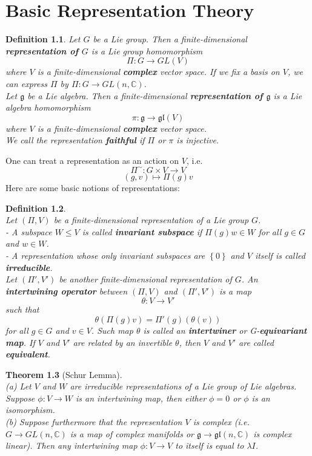 \documentclass[11pt]{book}
\newtheorem{theorem}{Theorem}[section]
\newtheorem{definition}[theorem]{Definition}
\newcommand{\bb}[1]{\mathbb{#1}}
\newcommand{\mf}[1]{\mathfrak{#1}}
\begin{document}
\newpage

\chapter{Basic Representation Theory}
\begin{definition}
Let $G$ be a Lie group. Then a finite-dimensional \textbf{representation of $G$} is a Lie group homomorphism
$$\Pi: G \to GL(V)$$
where $V$ is a finite-dimensional \textbf{complex} vector space. If we fix a basis on $V$, we can express $\Pi$ by $\Pi: G \to GL(n,\bb{C})$.\\
Let $\mf{g}$ be a Lie algebra. Then a finite-dimensional \textbf{representation of $\mf{g}$} is a Lie algebra homomorphism
$$\pi: \mf{g} \to \mf{gl}(V)$$
where $V$ is a finite-dimensional \textbf{complex} vector space.\\
We call the representation \textbf{faithful} if $\Pi$ or $\pi$ is injective.
\end{definition}
One can treat a representation as an action on $V$, i.e.
$$\Pi^{\sim}: G \times V \to V$$
$$(g,v) \mapsto \Pi(g)v$$
Here are some basic notions of representations:
\begin{definition} \mbox{}\\
Let $(\Pi,V)$ be a finite-dimensional representation of a Lie group $G$.\\
- A subspace $W \leq V$ is called \textbf{invariant subspace} if $\Pi(g)w \in W$ for all $g \in G$ and $w \in W$.\\
- A representation whose only invariant subspaces are $\left\{0\right\}$ and $V$ itself is called \textbf{irreducible}.\\
Let $(\Pi', V')$ be another finite-dimensional representation of $G$. An \textbf{intertwining operator} between $(\Pi,V)$ and $(\Pi',V')$ is a map
$$\theta: V \to V'$$
such that
$$\theta(\Pi(g)v) = \Pi'(g)(\theta(v))$$
for all $g \in G$ and $v \in V$. Such map $\theta$ is called an \textbf{intertwiner} or G-\textbf{equivariant map}.
If $V$ and $V'$ are related by an invertible $\theta$, then $V$ and $V'$ are called \textbf{equivalent}.
\end{definition}
\begin{theorem}[Schur Lemma]\mbox{}\\
(a) Let $V$ and $W$ are irreducible representations of a Lie group of Lie algebras. Suppose $\phi: V \to W$ is an intertwining map, then either $\phi = 0$ or $\phi$ is an isomorphism.\\
(b) Suppose furthermore that the representation $V$ is complex (i.e. $G \to GL(n,\bb{C})$ is a map of complex manifolds or $\mf{g} \to \mf{gl}(n,\bb{C})$ is complex linear). Then any intertwining map $\phi: V \to V$ to itself is equal to $\lambda I$.
\end{theorem}
\end{document}

